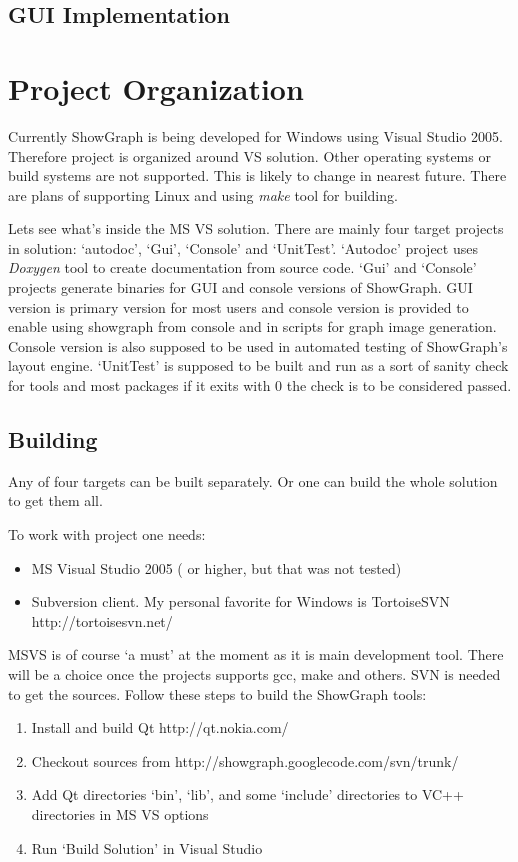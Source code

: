 \documentclass[11pt,twoside,a4paper]{article}
\begin{document}
\subsection{GUI Implementation}


\section{Project Organization}
Currently ShowGraph is being developed for Windows using Visual Studio 2005. Therefore project is organized around VS solution. Other operating systems or build systems are not supported. This is likely to change in nearest future. There are plans of supporting Linux and using \emph{make} tool for building.

Lets see what's inside the MS VS solution. There are mainly four target projects in solution: `autodoc', `Gui', `Console' and `UnitTest'. `Autodoc' project uses \emph{Doxygen} tool to create documentation from source code. `Gui' and `Console' projects generate binaries for GUI and console versions of ShowGraph. GUI version is primary version for most users and console version is provided to enable using showgraph from console and in scripts for graph image generation. Console version is also supposed to be used in automated testing of ShowGraph's layout engine. `UnitTest' is supposed to be built and run as a sort of sanity check for tools and most packages if it exits with 0 the check is to be considered passed.


\subsection{Building}
Any of four targets can be built separately. Or one can build the whole solution to get them all.

To work with project one needs:
\begin{itemize}
\item MS Visual Studio 2005 ( or higher, but that was not tested)\
\item Subversion client. My personal favorite for Windows is TortoiseSVN http://tortoisesvn.net/
\end{itemize}

MSVS is of course `a must' at the moment as it is main development tool. There will be a choice once the projects supports gcc, make and others. SVN is needed to get the sources. Follow these steps to build the ShowGraph tools:
\begin{enumerate}
\item Install and build Qt http://qt.nokia.com/
\item Checkout sources from http://showgraph.googlecode.com/svn/trunk/
\item Add Qt directories `bin', `lib', and some `include' directories to VC++ directories in MS VS options
\item Run `Build Solution' in Visual Studio
\end{enumerate}
\end{document}
